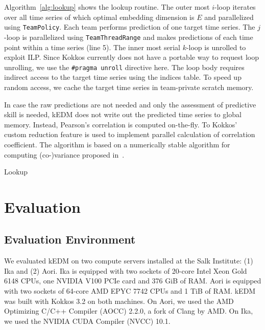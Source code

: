 \documentclass[sigconf]{acmart}
\begin{document}
Algorithm~\ref{alg:lookup} shows the lookup routine. The outer most $i$-loop
iterates over all time series of which optimal embedding dimension is $E$ and
parallelized using \texttt{TeamPolicy}. Each team performs prediction of one
target time series. The $j$-loop is parallelized using \texttt{TeamThreadRange}
and makes predictions of each time point within a time series (line 5). The
inner most serial $k$-loop is unrolled to exploit ILP\@. Since Kokkos currently
does not have a portable way to request loop unrolling, we use the
\texttt{\#pragma unroll} directive here. The loop body requires indirect access
to the target time series using the indices table. To speed up random access, we
cache the target time series in team-private scratch memory.

In case the raw predictions are not needed and only the assessment of predictive
skill is needed, kEDM does not write out the predicted time series to global
memory. Instead, Pearson’s correlation is computed on-the-fly. To Kokkos’ custom
reduction feature is used to implement parallel calculation of correlation
coefficient. The algorithm is based on a numerically stable algorithm for
computing (co-)variance proposed in~\cite{Schubert2018}.

\begin{algorithm}
    \SetAlgoLined
    \DontPrintSemicolon
    \caption{Lookup}%
    \label{alg:lookup}
\end{algorithm}

\section{Evaluation}\label{sec:evaluation}

\subsection{Evaluation Environment}


We evaluated kEDM on two compute servers installed at the Salk Institute: (1)
Ika and (2) Aori. Ika is equipped with two sockets of 20-core Intel Xeon Gold
6148 CPUs, one NVIDIA V100 PCIe card and 376 GiB of RAM\@. Aori is equipped with
two sockets of 64-core AMD EPYC 7742 CPUs and 1 TiB of RAM\@. kEDM was built
with Kokkos 3.2 on both machines. On Aori, we used the AMD Optimizing C/C++
Compiler (AOCC) 2.2.0, a fork of Clang by AMD. On Ika, we used the NVIDIA CUDA
Compiler (NVCC) 10.1.
\end{document}
